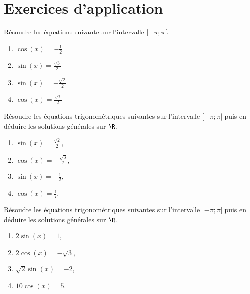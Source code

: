 \documentclass[11pt]{article}
\begin{document}
\newpage

\section{Exercices d'application}

\begin{exercice}
Résoudre les équations suivante sur l’intervalle \([-\pi ; \pi[\).
\begin{multicols}{2}
\begin{enumerate}
\item $\cos(x) = -\frac{1}{2}$
\item $\sin(x) = \frac{\sqrt{3}}{2}$
\item $\sin(x) = -\frac{\sqrt{2}}{2}$
\item $\cos(x) = \frac{\sqrt{3}}{2}$
\end{enumerate}
\end{multicols}
\end{exercice}

\begin{exercice}
Résoudre les équations trigonométriques suivantes sur l'intervalle
\([-\pi ; \pi[\) puis en déduire les solutions générales sur $\R$.
\begin{multicols}{2}
\begin{enumerate}
    \item \(\sin(x) = \frac{\sqrt{2}}{2}\),
    \item \(\cos(x) = -\frac{\sqrt{3}}{2}\),
    \item \(\sin(x) = -\frac{1}{2}\),
    \item \(\cos(x) = \frac{1}{2}\).
\end{enumerate}
\end{multicols}
\end{exercice}

\begin{exercice}
Résoudre les équations trigonométriques suivantes sur l'intervalle
\([-\pi ; \pi[\) puis en déduire les solutions générales sur $\R$.
\begin{multicols}{2}
\begin{enumerate}
    \item \(2\sin(x) = 1\),
    \item \(2\cos(x) = -\sqrt{3}\),
    \item \(\sqrt{2}\sin(x) = -2\),
    \item \(10\cos(x) = 5\).
\end{enumerate}
\end{multicols}
\end{exercice}
\end{document}
